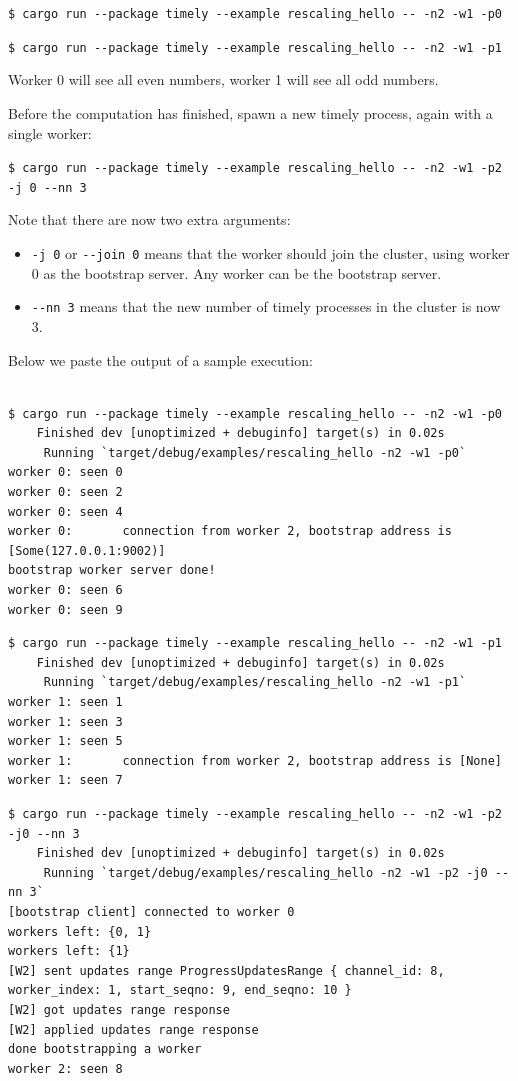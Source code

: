 \documentclass[12pt]{extarticle}
\begin{document}
\vspace{2mm}
\noindent
\verb|$ cargo run --package timely --example rescaling_hello -- -n2 -w1 -p0|

\noindent
\verb|$ cargo run --package timely --example rescaling_hello -- -n2 -w1 -p1|

\vspace{2mm}
Worker 0 will see all even numbers, worker 1 will see all odd numbers.

\noindent
Before the computation has finished, spawn a new timely process, again with a single worker:

\vspace{2mm}
\noindent
\verb|$ cargo run --package timely --example rescaling_hello -- -n2 -w1 -p2 -j 0 --nn 3| 

\vspace{2mm}
\noindent
Note that there are now two extra arguments:
\begin{itemize}
    \item \verb|-j 0| or \verb|--join 0| means that the worker should join the cluster, using worker 0 as the bootstrap server.
        Any worker can be the bootstrap server.
    \item \verb|--nn 3| means that the new number of timely processes in the cluster is now 3.
\end{itemize}

Below we paste the output of a sample execution:

\begin{verbatim}

$ cargo run --package timely --example rescaling_hello -- -n2 -w1 -p0
    Finished dev [unoptimized + debuginfo] target(s) in 0.02s
     Running `target/debug/examples/rescaling_hello -n2 -w1 -p0`
worker 0: seen 0
worker 0: seen 2
worker 0: seen 4
worker 0:       connection from worker 2, bootstrap address is [Some(127.0.0.1:9002)]
bootstrap worker server done!
worker 0: seen 6
worker 0: seen 9
\end{verbatim}


\begin{verbatim}
$ cargo run --package timely --example rescaling_hello -- -n2 -w1 -p1
    Finished dev [unoptimized + debuginfo] target(s) in 0.02s
     Running `target/debug/examples/rescaling_hello -n2 -w1 -p1`
worker 1: seen 1
worker 1: seen 3
worker 1: seen 5
worker 1:       connection from worker 2, bootstrap address is [None]
worker 1: seen 7
\end{verbatim}

\begin{verbatim}
$ cargo run --package timely --example rescaling_hello -- -n2 -w1 -p2 -j0 --nn 3
    Finished dev [unoptimized + debuginfo] target(s) in 0.02s
     Running `target/debug/examples/rescaling_hello -n2 -w1 -p2 -j0 --nn 3`
[bootstrap client] connected to worker 0
workers left: {0, 1}
workers left: {1}
[W2] sent updates range ProgressUpdatesRange { channel_id: 8, worker_index: 1, start_seqno: 9, end_seqno: 10 }
[W2] got updates range response
[W2] applied updates range response
done bootstrapping a worker
worker 2: seen 8
\end{verbatim}
\end{document}
